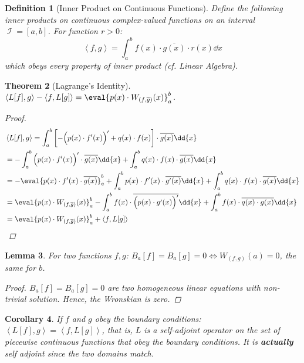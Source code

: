 \documentclass[12pt]{article}
\let\LR\Leftrightarrow
\DeclareMathOperator{\I}{\mathcal{I}}
\newcommand{\inner}[2]{\left\langle{#1},{#2}\right\rangle}
\newtheorem{theorem}{Theorem}[subsection]
\newtheorem{definition}[theorem]{Definition}
\newtheorem{lemma}[theorem]{Lemma}
\newtheorem{corollary}[theorem]{Corollary}
\begin{document}
\begin{definition}[Inner Product on Continuous Functions]
  Define the following inner products on continuous complex-valued functions on an interval $\I=[a,b]$. For function $r>0$:
  $$\inner{f}{g}=\int_a^b f(x)\cdot\overline{g(x)}\cdot r(x)\dd{x}$$ which obeys every property of inner product (cf. Linear Algebra).
\end{definition}

\begin{theorem}[Lagrange's Identity]
  $\inner{L[f]}{g}-\inner{f}{L[g]}=\eval{p(x)\cdot W_{(f,\overline{g})}(x)}_a^b$.
  \begin{proof}
    \begin{align*}
      &\inner{L[f]}{g}=\int_a^b \left[-\Big(p(x)\cdot f'(x)\Big)'+q(x)\cdot f(x)\right]\cdot\overline{g(x)}\dd{x}\\
      &=-\int_a^b \Big(p(x)\cdot f'(x)\Big)'\cdot \overline{g(x)}\dd{x}+\int_a^b q(x)\cdot f(x)\cdot\overline{g(x)}\dd{x}\\
      &=-\eval{p(x)\cdot f'(x)\cdot\overline{g(x)}}_a^b+\int_a^b p(x)\cdot f'(x)\cdot \overline{g'(x)}\dd{x}+\int_a^b q(x)\cdot f(x)\cdot\overline{g(x)}\dd{x}\\
      &=\eval{p(x)\cdot W_{(f,\overline{g})}(x)}_a^b-\int_a^b f(x)\cdot \overline{\Big(p(x)\cdot g'(x)\Big)'}\dd{x}+\int_a^b f(x)\cdot\overline{q(x)\cdot g(x)}\dd{x}\\
      &=\eval{p(x)\cdot W_{(f,\overline{g})}(x)}_a^b+\inner{f}{L[g]}
    \end{align*}
  \end{proof}
\end{theorem}

\begin{lemma}
  For two functions $f,g$: $B_a[f]=B_a[g]=0\LR W_{(f,g)}(a)=0$, the same for $b$.
  \begin{proof}
    $B_a[f]=B_a[g]=0$ are two homogeneous linear equations with non-trivial solution. Hence, the Wronskian is zero.
  \end{proof}
\end{lemma}

\begin{corollary}
  \label{self_adjoint}
  If $f$ and $g$ obey the boundary conditions: $\inner{L[f]}{g}=\inner{f}{L[g]}$, that is, $L$ is a self-adjoint operator on the set of piecewise continuous functions that obey the boundary conditions. It is \textbf{actually} self adjoint since the two domains match.
\end{corollary}
\end{document}
